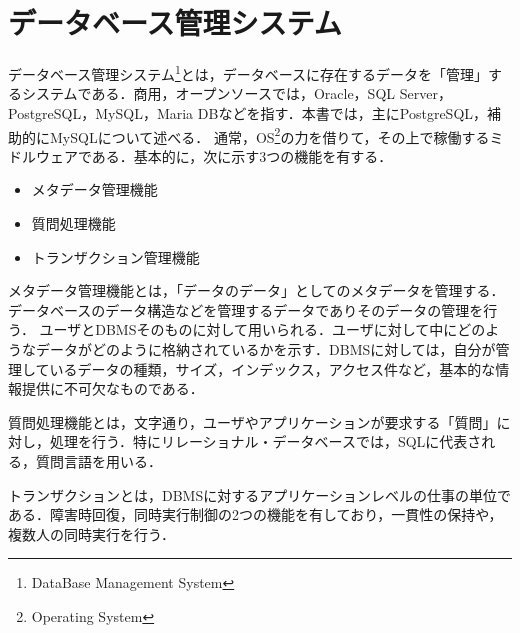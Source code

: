 \documentclass[a4paper,10pt]{jreport}
\begin{document}
\section{データベース管理システム}
データベース管理システム\footnote{DataBase Management System}とは，データベースに存在するデータを「管理」するシステムである．商用，オープンソースでは，Oracle，SQL Server，PostgreSQL，MySQL，Maria DBなどを指す．本書では，主にPostgreSQL，補助的にMySQLについて述べる．
通常，OS\footnote{Operating System}の力を借りて，その上で稼働するミドルウェアである．基本的に，次に示す3つの機能を有する．
\begin{itemize}
	\item メタデータ管理機能
	\item 質問処理機能
	\item トランザクション管理機能
\end{itemize}
\par メタデータ管理機能とは，「データのデータ」としてのメタデータを管理する．データベースのデータ構造などを管理するデータでありそのデータの管理を行う．
ユーザとDBMSそのものに対して用いられる．ユーザに対して中にどのようなデータがどのように格納されているかを示す．DBMSに対しては，自分が管理しているデータの種類，サイズ，インデックス，アクセス件など，基本的な情報提供に不可欠なものである．
\par 質問処理機能とは，文字通り，ユーザやアプリケーションが要求する「質問」に対し，処理を行う．特にリレーショナル・データベースでは，SQLに代表される，質問言語を用いる．
\par トランザクションとは，DBMSに対するアプリケーションレベルの仕事の単位である．障害時回復，同時実行制御の2つの機能を有しており，一貫性の保持や，複数人の同時実行を行う．
\end{document}

